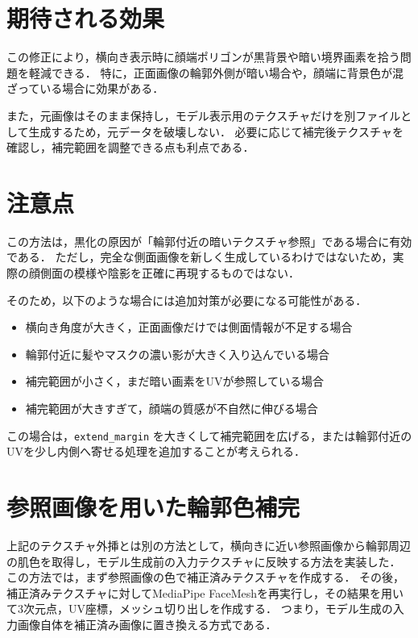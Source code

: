 \documentclass[uplatex,dvipdfmx]{jsarticle}
\begin{document}
\section{期待される効果}

この修正により，横向き表示時に顔端ポリゴンが黒背景や暗い境界画素を拾う問題を軽減できる．
特に，正面画像の輪郭外側が暗い場合や，顔端に背景色が混ざっている場合に効果がある．

また，元画像はそのまま保持し，モデル表示用のテクスチャだけを別ファイルとして生成するため，元データを破壊しない．
必要に応じて補完後テクスチャを確認し，補完範囲を調整できる点も利点である．

\section{注意点}

この方法は，黒化の原因が「輪郭付近の暗いテクスチャ参照」である場合に有効である．
ただし，完全な側面画像を新しく生成しているわけではないため，実際の顔側面の模様や陰影を正確に再現するものではない．

そのため，以下のような場合には追加対策が必要になる可能性がある．

\begin{itemize}
  \item 横向き角度が大きく，正面画像だけでは側面情報が不足する場合
  \item 輪郭付近に髪やマスクの濃い影が大きく入り込んでいる場合
  \item 補完範囲が小さく，まだ暗い画素をUVが参照している場合
  \item 補完範囲が大きすぎて，顔端の質感が不自然に伸びる場合
\end{itemize}

この場合は，\verb|extend_margin| を大きくして補完範囲を広げる，または輪郭付近のUVを少し内側へ寄せる処理を追加することが考えられる．

\section{参照画像を用いた輪郭色補完}

上記のテクスチャ外挿とは別の方法として，横向きに近い参照画像から輪郭周辺の肌色を取得し，モデル生成前の入力テクスチャに反映する方法を実装した．
この方法では，まず参照画像の色で補正済みテクスチャを作成する．
その後，補正済みテクスチャに対してMediaPipe FaceMeshを再実行し，その結果を用いて3次元点，UV座標，メッシュ切り出しを作成する．
つまり，モデル生成の入力画像自体を補正済み画像に置き換える方式である．
\end{document}
